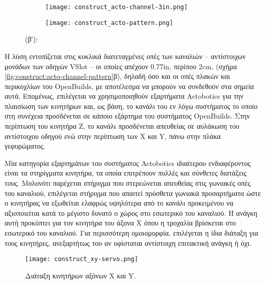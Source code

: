 \begin{figure}
    \caption{Κανάλι Actobotics και διάταξη οπών.
        \label{fig:construct:acto-channel-pattern}}
    \begin{center}
        \begin{subfigure}[b]{0.40\textwidth}
            \texttt{[image: construct\_acto-channel-3in.png]}
            \caption{}
        \end{subfigure}
        \begin{subfigure}[b]{0.35\textwidth}
            \texttt{[image: construct\_acto-pattern.png]}
            \caption{}
        \end{subfigure}
    \end{center}

    (βʹ): 
\end{figure}

Η λύση εντοπίζεται στις κυκλικά διατεταγμένες οπές των καναλιών -- αντίστοιχων
μονάδων των οδηγών VSlot -- οι οποίες απέχουν 0.77in, περίπου 2cm, (σχήμα
\ref{fig:construct:acto-channel-pattern}β), δηλαδή όσο και οι οπές πλακών και
περικοχλίων του OpenBuilds, με αποτέλεσμα να μπορούν να συνδεθούν στα σημεία
αυτά.
Επομένως, επιλέγεται να χρησιμοποιηθούν εξαρτήματα Actobotics για την πλαισίωση
των κινητήρων και, ως βάση, το κανάλι του εν λόγω συστήματος το οποίο στη
συνέχεια προσδένεται σε κάποιο εξάρτημα του συστήματος OpenBuilds. Στην
περίπτωση του κινητήρα Z, το κανάλι προσδένεται απευθείας σε αυλάκωση του 
αντίστοιχου οδηγού ενώ στην περίπτωση των X και Y, πάνω στην πλάκα γεφυρώματος.

Μία κατηγορία εξαρτημάτων του συστήματος Actobotics ιδιαίτερου ενδιαφέροντος
είναι τα στηρίγματα κινητήρα, τα οποία επιτρέπουν πολλές και σύνθετες διατάξεις
τους. Μολονότι παρέχεται στήριγμα που στερεώνεται απευθείας στις γωνιακές οπές
του καναλιού, επιλέγεται στήριγμα που απαιτεί πρόσθετα γωνιακά προσαρτήματα ώστε
ο κινητήρας να εξωθείται ελαφρώς υψηλότερα από το κανάλι προκειμένου να
αξιοποιείται κατά το μέγιστο δυνατό ο χώρος στο εσωτερικό του καναλιού.
Η ανάγκη αυτή προκύπτει για τον κινητήρα του άξονα X όπου η τροχαλία βρίσκεται
στο εσωτερικό του καναλιού. Για περισσότερη ομοιομορφία, επιλέγεται η ίδια
διάταξη για τους κινητήρες, ανεξαρτήτως του αν υφίσταται αντίστοιχη επιτακτική
ανάγκη ή όχι.

\begin{figure}
    \caption{Διάταξη κινητήρων αξόνων X και Y.\label{fig:construct:xy-servo}}
    \begin{center}%
    \def\svgwidth{0.5\textwidth}
%    
    \texttt{[image: construct\_xy-servo.png]}
    \end{center}
\end{figure}
%

